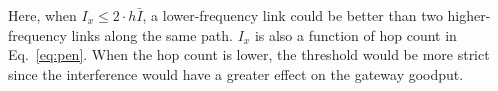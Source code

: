 Here, when $I_x \leq 2\cdot h\bar{I}$, a lower-frequency link could 
be better than two higher-frequency links along the same path. $I_x$ is also a function of hop count 
in Eq.~\ref{eq:pen}. When the hop count is lower, the threshold would be more strict since the
interference would have a greater effect on the gateway goodput.




